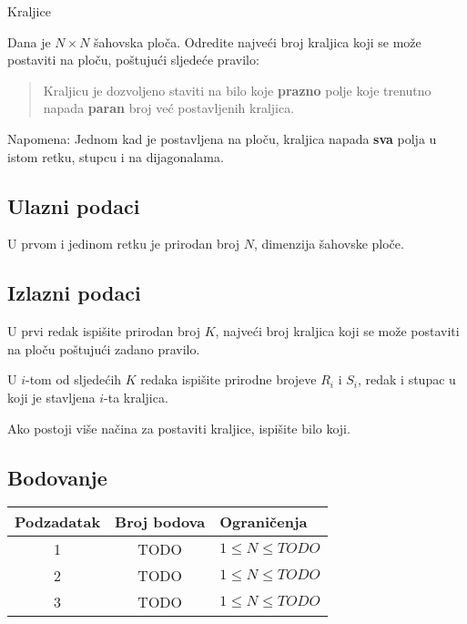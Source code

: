 \begin{statement}[
  problempoints=100,
  timelimit=1 sekunda,
  memorylimit=512 MiB,
]{Kraljice}

Dana je $N \times N$ šahovska ploča. Odredite najveći broj kraljica koji se može postaviti na ploču, poštujući sljedeće pravilo:
\begin{quote}
    Kraljicu je dozvoljeno staviti na bilo koje \textbf{prazno} polje koje trenutno napada \textbf{paran} broj već postavljenih kraljica.
\end{quote}

Napomena: Jednom kad je postavljena na ploču, kraljica napada \textbf{sva} polja u istom retku, stupcu i na dijagonalama.

\subsection*{Ulazni podaci}
U prvom i jedinom retku je prirodan broj $N$, dimenzija šahovske ploče.

\subsection*{Izlazni podaci}

U prvi redak ispišite prirodan broj $K$, najveći broj kraljica koji se može postaviti na ploču poštujući zadano pravilo.

U $i$-tom od sljedećih $K$ redaka ispišite prirodne brojeve $R_i$ i $S_i$, redak i stupac u koji je stavljena $i$-ta kraljica.

Ako postoji više načina za postaviti kraljice, ispišite bilo koji.

\subsection*{Bodovanje}
{\renewcommand{\arraystretch}{1.4}
  \setlength{\tabcolsep}{6pt}
  \begin{tabular}{ccl}
 Podzadatak & Broj bodova & Ograničenja \\ \midrule
  1 & TODO & $1 \le N \le TODO$\\
  2 & TODO & $1 \le N \le TODO$\\
  3 & TODO & $1 \le N \le TODO$\\
\end{tabular}}


\end{statement}
